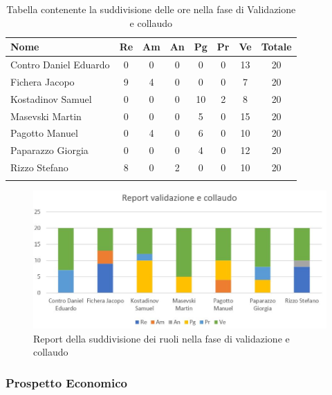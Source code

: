 \documentclass[../piano_di_progetto.tex]{subfiles}
\begin{document}
\begin{center}
	\begin{longtable}{|l|c|c|c|c|c|c|c|}
		\hline
		\rowcolor{lightgray}
		\textbf{Nome} & \textbf{Re} & \textbf{Am} & \textbf{An} & \textbf{Pg}  & \textbf{Pr}   & \textbf{Ve} & \textbf{Totale} \\

		\hline
			Contro Daniel Eduardo & 0 & 0 & 0 & 0 & 0 & 13 & 20\\
		\hline
			Fichera Jacopo & 9 & 4 & 0 & 0 & 0 & 7 & 20 \\ 
		\hline
			Kostadinov Samuel & 0 & 0 & 0 & 10 & 2 & 8 & 20 \\ 		
		\hline
			Masevski Martin & 0 & 0 & 0 & 5 & 0 & 15 & 20 \\
		\hline
			Pagotto Manuel & 0 & 4 & 0 & 6 & 0 & 10 & 20 \\			
		\hline
			Paparazzo Giorgia & 0 & 0 & 0 & 4 & 0 & 12 & 20 \\
		\hline
			Rizzo Stefano & 8 & 0 & 2 & 0 & 0 & 10 & 20 \\
		\hline	

		\caption{Tabella contenente la suddivisione delle ore nella fase di Validazione e collaudo}
	\end{longtable}
\end{center}

\begin{figure}[H]
\centering
\includegraphics[width=12cm]{img/report_valid_collaudo}
\caption{Report della suddivisione dei ruoli nella fase di validazione e collaudo}
\end{figure}

\subsubsection{Prospetto Economico}
\end{document}
